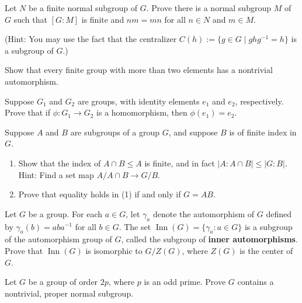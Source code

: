 \documentclass[11pt,twoside,openany]{memoir}
\begin{document}
        \begin{exercise}
        Let $N$ be a finite normal subgroup of $G$. Prove there is a normal subgroup $M$ of $G$ such that $[G:M]$ is finite and $nm=mn$ for all $n\in N$ and $m\in M$.
        
        \medskip
        \noindent ({Hint:} You may use the fact that the centralizer $C(h):=\{g\in G\mid ghg^{-1}=h\}$ is a subgroup of $G$.)
        \end{exercise}
        
        \begin{exercise}
        Show that every finite group with more than two elements has a nontrivial automorphism.
        \end{exercise}
        
        \begin{exercise}
        Suppose $G_1$ and $G_2$ are groups, with identity elements $e_1$ and $e_2$, respectively. Prove that if $\phi:G_1\to G_2$ is a homomorphism, then $\phi(e_1)=e_2$.
        \end{exercise}
        
        \begin{exercise}
        Suppose $A$ and $B$ are subgroups of a group $G$, and suppose $B$ is of finite index in $G$.
        \begin{enumerate}[topsep=0.1in,label = (\arabic*)]
            \item Show that the index of $A\cap B\le A$ is finite, and in fact $|A:A\cap B|\le |G:B|$. {Hint:} Find a set map $A/A\cap B\to G/B$.
            \item Prove that equality holds in (1) if and only if $G=AB$.
        \end{enumerate}
        \end{exercise}
        
        \begin{exercise}
        Let $G$ be a group. For each $a\in G$, let $\gamma_a$ denote the automorphism of $G$ defined by $\gamma_a(b)=aba^{-1}$ for all $b\in G$. The set $\operatorname{Inn}(G)=\{\gamma_a:a\in G\}$ is a subgroup of the automorphism group of $G$, called the subgroup of \textbf{inner automorphisms}. Prove that $\operatorname{Inn}(G)$ is isomorphic to $G/Z(G)$, where $Z(G)$ is the center of $G$.
        \end{exercise}
        
        \begin{exercise}
        Let $G$ be a group of order $2p$, where $p$ is an odd prime. Prove $G$ contains a nontrivial, proper normal subgroup.
        \end{exercise}
        
\end{document}
